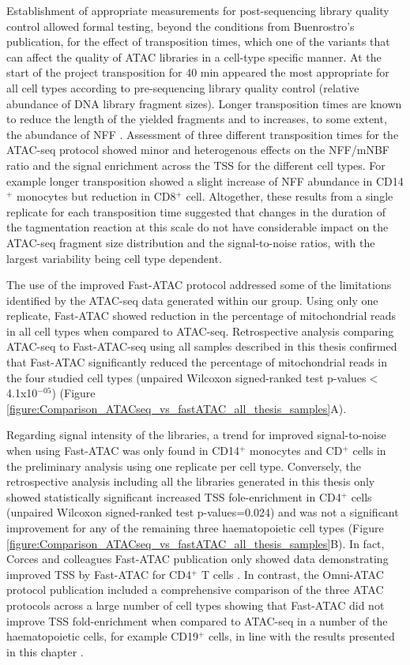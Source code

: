 Establishment of appropriate measurements for post-sequencing library quality control allowed formal testing, beyond the conditions from Buenrostro's publication, for the effect of transposition times, which one of the variants that can affect the quality of ATAC libraries in a cell-type specific manner. At the start of the project transposition for 40 min appeared the most appropriate for all cell types according to pre-sequencing library quality control (relative abundance of DNA library fragment sizes). Longer transposition times are known to reduce the length of the yielded fragments and to increases, to some extent, the abundance of NFF \parencite{Raurell-Vila2018}. Assessment of three different transposition times for the ATAC-seq protocol showed minor and heterogenous effects on the NFF/mNBF ratio and the signal enrichment across the TSS for the different cell types. For example longer transposition showed a slight increase of NFF abundance in CD14$^+$ monocytes but reduction in CD8$^+$ cell. Altogether, these results from a single replicate for each transposition time suggested that changes in the duration of the tagmentation reaction at this scale do not have considerable impact on the ATAC-seq fragment size distribution and the signal-to-noise ratios, with the largest variability being cell type dependent.

The use of the improved Fast-ATAC protocol addressed some of the limitations identified by the ATAC-seq data generated within our group. Using only one replicate, Fast-ATAC showed reduction in the percentage of mitochondrial reads in all cell types when compared to ATAC-seq. Retrospective analysis comparing ATAC-seq to Fast-ATAC-seq using all samples described in this thesis confirmed that Fast-ATAC significantly reduced the percentage of mitochondrial reads in the four studied cell types (unpaired Wilcoxon signed-ranked test p-values$<$4.1x10$^{-05}$) (Figure \ref{figure:Comparison_ATACseq_vs_fastATAC_all_thesis_samples}A). 

Regarding signal intensity of the libraries, a trend for improved signal-to-noise when using Fast-ATAC was only found in CD14$^+$ monocytes and CD$^+$ cells in the preliminary analysis using one replicate per cell type. Conversely, the retrospective analysis including all the libraries generated in this thesis only showed statistically significant increased TSS fole-enrichment in CD4$^+$ cells (unpaired Wilcoxon signed-ranked test p-values=0.024) and was not a significant improvement for any of the remaining three haematopoietic cell types (Figure  \ref{figure:Comparison_ATACseq_vs_fastATAC_all_thesis_samples}B). In fact, Corces and colleagues Fast-ATAC publication only showed data demonstrating improved TSS by Fast-ATAC for CD4$^+$ T cells \parencite{Corces2016}. In contrast, the Omni-ATAC protocol publication included a comprehensive comparison of the three ATAC protocols across a large number of cell types showing that Fast-ATAC did not improve TSS fold-enrichment when compared to ATAC-seq in a number of the haematopoietic cells, for example CD19$^+$ cells, in line with the results presented in this chapter \parencite{Corces2017}.

